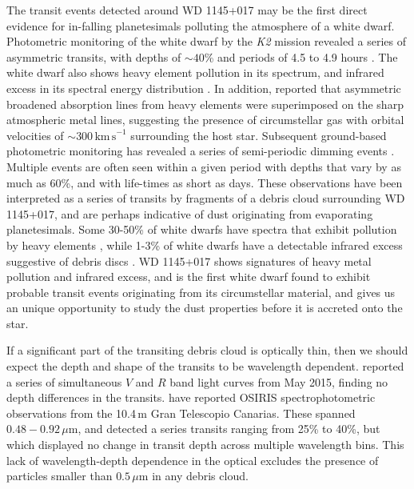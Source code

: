\documentclass[useAMS,usenatbib]{mn2e}
\begin{document}
The transit events detected around WD 1145+017 may be the first direct evidence for in-falling planetesimals polluting the atmosphere of a white dwarf. Photometric monitoring of the white dwarf by the \emph{K2} mission \citep{2014PASP..126..398H} revealed a series of asymmetric transits, with depths of $\sim 40$\% and periods of 4.5 to 4.9 hours \citep{2015Natur.526..546V}. The white dwarf also shows heavy element pollution in its spectrum, and infrared excess in its spectral energy distribution \citep{2015Natur.526..546V,2016ApJ...816L..22X}. In addition, \citet{2016ApJ...816L..22X} reported that asymmetric broadened absorption lines from heavy elements were superimposed on the sharp atmospheric metal lines, suggesting the presence of circumstellar gas with orbital velocities of $\sim$300$\,\mathrm{km\,s}^{-1}$ surrounding the host star. Subsequent ground-based photometric monitoring has revealed a series of semi-periodic dimming events \citep{2015Natur.526..546V,2015arXiv151006434C,2016ApJ...818L...7G,2016MNRAS.tmp..406R,2016arXiv160308823A}. Multiple events are often seen within a given period with depths that vary by as much as 60\%, and with life-times as short as days. These observations have been interpreted as a series of transits by fragments of a debris cloud surrounding WD 1145+017, and are perhaps indicative of dust originating from evaporating planetesimals. Some 30-50\% of white dwarfs have spectra that exhibit pollution by heavy elements \citep[e.g.][]{2003ApJ...596..477Z,2010ApJ...722..725Z,2014A&A...566A..34K}, while 1-3\% of white dwarfs have a detectable infrared excess suggestive of debris discs \citep[e.g.][]{2003ApJ...584L..91J,2007ApJS..171..206M,2009ApJ...694..805F,2011MNRAS.417.1210G,2011ApJS..197...38D}. WD 1145+017 shows signatures of heavy metal pollution and infrared excess, and is the first white dwarf found to exhibit probable transit events originating from its circumstellar material, and gives us an unique opportunity to study the dust properties before it is accreted onto the star. 

If a significant part of the transiting debris cloud is optically thin, then we should expect the depth and shape of the transits to be wavelength dependent. \citet{2015arXiv151006434C} reported a series of simultaneous $V$ and $R$ band light curves from May 2015, finding no depth differences in the transits. \citet{2016arXiv160308823A} have reported OSIRIS spectrophotometric observations from the 10.4\,m Gran Telescopio Canarias. These spanned $0.48-0.92\,\mu\mathrm{m}$, and detected a series transits ranging from 25\% to 40\%, but which displayed no change in transit depth across multiple wavelength bins. This lack of wavelength-depth dependence in the optical excludes the presence of particles smaller than $ 0.5\,\mu \mathrm{m}$ in any debris cloud. 
\end{document}
